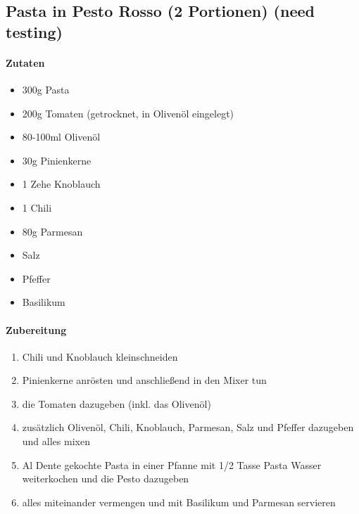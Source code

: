 \newpage
\subsection{Pasta in Pesto Rosso (2 Portionen) (need testing)}
\paragraph{Zutaten}
\begin{itemize}[noitemsep]
	\item 300g Pasta
	\item 200g Tomaten (getrocknet, in Olivenöl eingelegt)
	\item 80-100ml Olivenöl
	\item 30g Pinienkerne
	\item 1 Zehe Knoblauch
	\item 1 Chili
	\item 80g Parmesan
	\item Salz
	\item Pfeffer
	\item Basilikum 
\end{itemize}
\paragraph{Zubereitung}
\begin{enumerate}
	\item Chili und Knoblauch kleinschneiden
	\item Pinienkerne anrösten und anschließend in den Mixer tun
	\item die Tomaten dazugeben (inkl. das Olivenöl)
	\item zusätzlich Olivenöl, Chili, Knoblauch, Parmesan, Salz und Pfeffer dazugeben und alles mixen
	\item Al Dente gekochte Pasta in einer Pfanne mit 1/2 Tasse Pasta Wasser weiterkochen und die Pesto dazugeben 
	\item alles miteinander vermengen und mit Basilikum und Parmesan servieren
\end{enumerate}
